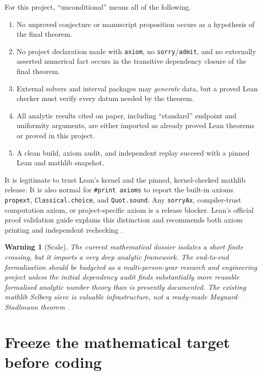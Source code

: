 \documentclass[11pt]{article}
\newtheorem{warning}{Warning}
\newcommand{\leanname}[1]{\texttt{#1}}
\begin{document}
For this project, ``unconditional'' means all of the following.

\begin{enumerate}[label=U\arabic*.,leftmargin=3.2em]
\item No unproved conjecture or manuscript proposition occurs as a hypothesis
  of the final theorem.
\item No project declaration made with \leanname{axiom}, no
  \leanname{sorry}/\leanname{admit}, and no externally asserted numerical fact
  occurs in the transitive dependency closure of the final theorem.
\item External solvers and interval packages may \emph{generate} data, but a
  proved Lean checker must verify every datum needed by the theorem.
\item All analytic results cited on paper, including ``standard'' endpoint and
  uniformity arguments, are either imported as already proved Lean theorems or
  proved in this project.
\item A clean build, axiom audit, and independent replay succeed with a pinned
  Lean and mathlib snapshot.
\end{enumerate}

It is legitimate to trust Lean's kernel and the pinned, kernel-checked mathlib
release.  It is also normal for \leanname{\#print axioms} to report the built-in
axioms \leanname{propext}, \leanname{Classical.choice}, and
\leanname{Quot.sound}.  Any \leanname{sorryAx}, compiler-trust computation
axiom, or project-specific axiom is a release blocker.  Lean's official proof
validation guide explains this distinction and recommends both axiom printing
and independent rechecking \cite{LeanValidation}.

\begin{warning}[Scale]
The current mathematical dossier isolates a short finite crossing, but it
imports a very deep analytic framework.  The end-to-end formalisation should be
budgeted as a multi-person-year research and engineering project unless the
initial dependency audit finds substantially more reusable formalised analytic
number theory than is presently documented.  The existing mathlib Selberg
sieve is valuable infrastructure, not a ready-made Maynard--Stadlmann theorem
\cite{MathlibSelberg}.
\end{warning}

\section{Freeze the mathematical target before coding}
\end{document}
